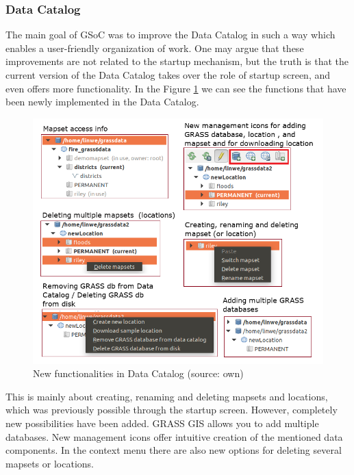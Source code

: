 \documentclass[a4paper,10pt,twoside]{article}
\begin{document}
\newpage
\vspace*{-1cm}
\subsubsection{Data Catalog}

The main goal of GSoC was to improve the Data Catalog in such a way which enables a user-friendly organization of work. One may argue that these improvements are not related to the startup mechanism, but the truth is that the current version of the Data Catalog takes over the role of startup screen, and even offers more functionality. In the Figure \ref{fig:function} we can see the functions that have been newly implemented in the Data Catalog.

\vspace{0.3cm}
\begin{figure}[hbt!] 
\begin{center}
\includegraphics[width=15cm]{../pictures/funkce.png} 
\caption[New functionalities in Data Catalog ]{New functionalities in Data Catalog (source: own)}
\label{fig:function}
\end{center}
\end{figure}

\noindent This is mainly about creating, renaming and deleting mapsets and locations, which was previously possible through the startup screen. However, completely new possibilities have been added. GRASS GIS allows you to add multiple databases. New management icons offer intuitive creation of the mentioned data components. In the context menu there are also new options for deleting several mapsets or locations.
\end{document}
